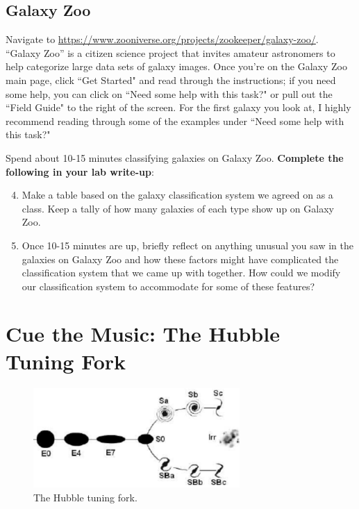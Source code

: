 \documentclass[11pt]{article}
\begin{document}
\subsection{Galaxy Zoo}

Navigate to \url{https://www.zooniverse.org/projects/zookeeper/galaxy-zoo/}. ``Galaxy Zoo'' is a citizen science project that invites amateur astronomers to help categorize large data sets of galaxy images. Once you're on the Galaxy Zoo main page, click ``Get Started" and read through the instructions; if you need some help, you can click on ``Need some help with this task?" or pull out the ``Field Guide" to the right of the screen. For the first galaxy you look at, I highly recommend reading through some of the examples under ``Need some help with this task?" 

\medskip \noindent
Spend about 10-15 minutes classifying galaxies on Galaxy Zoo. \textbf{Complete the following in your lab write-up}:
\begin{enumerate}
\setcounter{enumi}{3}

    \item Make a table based on the galaxy classification system we agreed on as a class. Keep a tally of how many galaxies of each type show up on Galaxy Zoo.
    
    \item Once 10-15 minutes are up, briefly reflect on anything unusual you saw in the galaxies on Galaxy Zoo and how these factors might have complicated the classification system that we came up with together. How could we modify our classification system to accommodate for some of these features?
\end{enumerate}


\section{Cue the Music: The Hubble Tuning Fork}

\begin{figure} [h!]
    \centering
    \includegraphics[width=0.7\textwidth]{Images/The-Hubble-tuning-fork.png}
    \caption{The Hubble tuning fork.}
    \label{fig:Hubble}
\end{figure}
\end{document}
